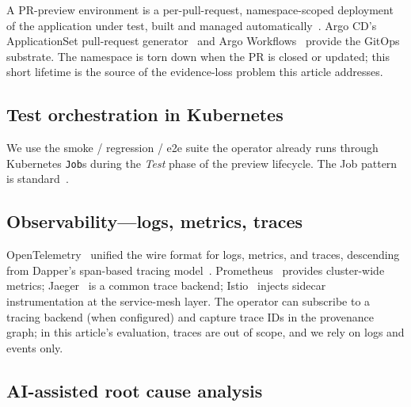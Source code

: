 \documentclass[sigconf, nonacm=true, anonymous=false, review=false]{acmart}
\begin{document}
A PR-preview environment is a per-pull-request, namespace-scoped
deployment of the application under test, built and managed
automatically~\cite{signadot_preview_envs, okteto_preview_envs,
jenkinsx_preview_envs}. Argo CD's ApplicationSet pull-request
generator~\cite{argocd_pr_generator, argocd_cncf} and Argo
Workflows~\cite{argo_workflows_cncf} provide the GitOps substrate.
The namespace is torn down when the PR is closed or updated; this
short lifetime is the source of the evidence-loss problem this
article addresses.

\subsection{Test orchestration in Kubernetes}
\label{sec:bg-tests}

We use the smoke / regression / e2e suite the operator already runs
through Kubernetes \texttt{Job}s during the \emph{Test} phase of the
preview lifecycle. The Job pattern is standard~\cite{kubernetes_jobs}.

\subsection{Observability---logs, metrics, traces}
\label{sec:bg-obs}

OpenTelemetry~\cite{opentelemetry_docs, opentelemetry_operator}
unified the wire format for logs, metrics, and traces, descending
from Dapper's span-based tracing model~\cite{dapper_2010}.
Prometheus~\cite{prometheus_cncf} provides cluster-wide metrics;
Jaeger~\cite{jaeger_cncf} is a common trace backend;
Istio~\cite{istio_service_mesh} injects sidecar instrumentation at
the service-mesh layer. The operator can subscribe to a tracing
backend (when configured) and capture trace IDs in the provenance
graph; in this article's evaluation, traces are out of scope, and
we rely on logs and events only.

\subsection{AI-assisted root cause analysis}
\label{sec:bg-rca}
\end{document}
